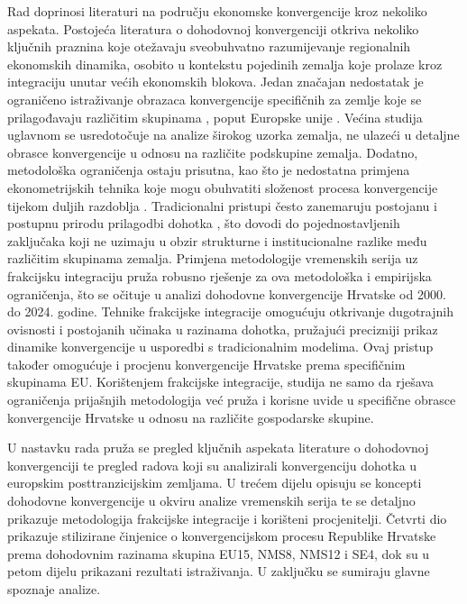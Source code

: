 \documentclass{crebsshr}
\begin{document}
Rad doprinosi literaturi na području ekonomske konvergencije kroz nekoliko aspekata. Postojeća literatura o dohodovnoj konvergenciji \citep{aggarwal:23} otkriva nekoliko ključnih praznina koje otežavaju sveobuhvatno razumijevanje regionalnih ekonomskih dinamika, osobito u kontekstu pojedinih zemalja koje prolaze kroz integraciju unutar većih ekonomskih blokova. Jedan značajan nedostatak je ograničeno istraživanje obrazaca konvergencije specifičnih za zemlje koje se prilagođavaju različitim skupinama \citep{cunado:03}, poput Europske unije \citep{brueggemann-trenkler:07}. Većina studija uglavnom se usredotočuje na analize širokog uzorka zemalja, ne ulazeći u detaljne obrasce konvergencije u odnosu na različite podskupine zemalja. Dodatno, metodološka ograničenja ostaju prisutna, kao što je nedostatna primjena ekonometrijskih tehnika koje mogu obuhvatiti složenost procesa konvergencije tijekom duljih razdoblja \citep{granger:80,granger:81,hosking:81}. Tradicionalni pristupi često zanemaruju postojanu i postupnu prirodu prilagodbi dohotka \citep{caselli:96}, što dovodi do pojednostavljenih zaključaka koji ne uzimaju u obzir strukturne i institucionalne razlike među različitim skupinama zemalja. Primjena metodologije vremenskih serija uz frakcijsku integraciju pruža robusno rješenje za ova metodološka i empirijska ograničenja, što se očituje u analizi dohodovne konvergencije Hrvatske od 2000. do 2024. godine. Tehnike frakcijske integracije \citep{cunado:06, ayala:12} omogućuju otkrivanje dugotrajnih ovisnosti i postojanih učinaka u razinama dohotka, pružajući precizniji prikaz dinamike konvergencije u usporedbi s tradicionalnim modelima. Ovaj pristup također omogućuje i procjenu konvergencije Hrvatske prema specifičnim skupinama EU. Korištenjem frakcijske integracije, studija ne samo da rješava ograničenja prijašnjih metodologija već pruža i korisne uvide u specifične obrasce konvergencije Hrvatske u odnosu na različite gospodarske skupine.  

U nastavku rada pruža se pregled ključnih aspekata literature o dohodovnoj konvergenciji te pregled radova koji su analizirali konvergenciju dohotka u europskim posttranzicijskim zemljama. U trećem dijelu opisuju se koncepti dohodovne konvergencije u okviru analize vremenskih serija te se detaljno prikazuje metodologija frakcijske integracije i korišteni procjenitelji. Četvrti dio prikazuje stilizirane činjenice o konvergencijskom procesu Republike Hrvatske prema dohodovnim razinama skupina EU15, NMS8, NMS12 i SE4, dok su u petom dijelu prikazani rezultati istraživanja. U zaključku se sumiraju glavne spoznaje analize.
\end{document}
